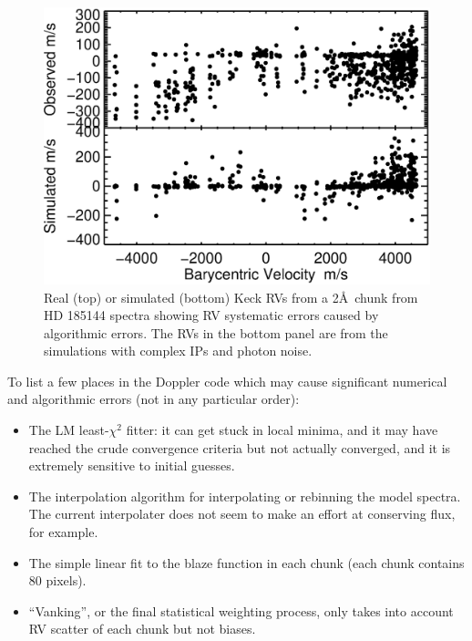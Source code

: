 \begin{figure}
\centering
\includegraphics[scale=0.5]{keck/chunkcomp-algorithm.eps} 
\caption{Real (top) or simulated (bottom) Keck RVs from a 2\AA\ chunk
from HD 185144 spectra showing RV systematic errors caused by
algorithmic errors. The RVs in the bottom panel are from the
simulations with complex IPs and photon noise.
\label{telluric:fig:chunkalgorithm}}
\end{figure}


To list a few places in the Doppler code which may cause significant
numerical and algorithmic errors (not in any particular order): 
\begin{itemize}
\item The LM least-$\chi^2$ fitter: it can get stuck in local
  minima, and it may have reached the crude convergence criteria but not
  actually converged, and it is extremely sensitive to initial guesses.
\item The interpolation algorithm for interpolating or rebinning the model
  spectra. The current interpolater does not seem to make an effort at
  conserving flux, for example. 
\item The simple linear fit to the blaze function in each chunk (each
  chunk contains 80 pixels).
\item ``Vanking'', or the final statistical weighting process, only
  takes into account RV scatter of each chunk but not biases.
\end{itemize}

